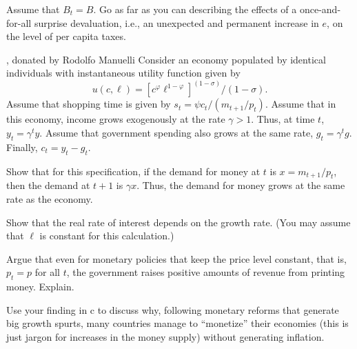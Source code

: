  Assume that $B_t = B$.  Go as far as you can describing the
effects of a once-and-for-all surprise devaluation, i.e., an unexpected and
permanent increase in $e$, on the level of per capita taxes.
\medskip


 , donated
by Rodolfo Manuelli
\medskip\noindent
Consider an economy populated by identical individuals with instantaneous
utility function given  by
$$ u(c,\ell) = [c^\varphi \ell^{1-\varphi}]^{(1-\sigma)}/(1-\sigma).  $$
Assume that shopping time is given by  $s_t = \psi c_t/(m_{t+1}/p_t)$.
Assume that in this economy, income grows exogenously at the rate $\gamma > 1$.
Thus, at time $t$, $y_t = \gamma^t y$.  Assume that government spending
also grows at the same rate, %
$g_t = \gamma^t g$.
Finally, $c_t = y_t - g_t$.
\medskip


 Show that for this specification, if the demand for money at
$t$ is $x = m_{t+1}/p_t$, then the demand at $t+1$ is $\gamma x$.  Thus,
the demand for money grows at the same rate as the economy.
\medskip


 Show that the real rate of interest depends on the growth rate.
(You may assume that $\ell$ is constant for this calculation.)
\medskip


 Argue that even for monetary policies that keep the price
level constant, that is, $p_t = p$ for all $t$, the government raises
positive amounts of revenue from printing money. Explain.

\medskip


 Use your finding in c to discuss why, following monetary
reforms that generate big growth spurts, many countries manage to
``monetize'' their economies (this is just jargon for increases in
the money supply) without generating inflation.
